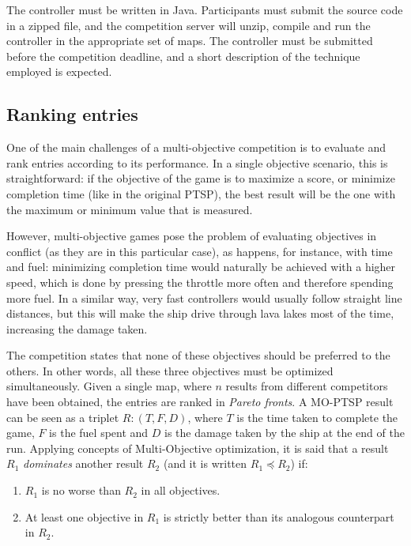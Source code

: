 \documentclass[conference]{IEEEtran}
\begin{document}
The controller must be written in Java. Participants must submit the source code in a zipped file, and the competition server will unzip, compile and run the controller in the appropriate set of maps. The controller must be submitted before the competition deadline, and a short description of the technique employed is expected.


\subsection{Ranking entries}

One of the main challenges of a multi-objective competition is to evaluate and rank entries according to its performance. In a single objective scenario, this is straightforward: if the objective of the game is to maximize a score, or minimize completion time (like in the original PTSP), the best result will be the one with the maximum or minimum value that is measured.

However, multi-objective games pose the problem of evaluating objectives in conflict (as they are in this particular case), as happens, for instance, with time and fuel: minimizing completion time would naturally be achieved with a higher speed, which is done by pressing the throttle more often and therefore spending more fuel. In a similar way, very fast controllers  would usually follow straight line distances, but this will make the ship drive through lava lakes most of the time, increasing the damage taken.

The competition states that none of these objectives should be preferred to the others. In other words, all these three objectives must be optimized simultaneously. Given a single map, where $n$ results from different competitors have been obtained, the entries are ranked in \textit{Pareto fronts}. A MO-PTSP result can be seen as a triplet $R: (T, F, D)$, where $T$ is the time taken to complete the game, $F$ is the fuel spent and $D$ is the damage taken by the ship at the end of the run. Applying concepts of Multi-Objective optimization, it is said that a result $R_1$ \textit{dominates} another result $R_2$ (and it is written $R_1 \preceq R_2$) if:

\begin{enumerate}
\item $R_1$ is no worse than $R_2$ in all objectives.
\item At least one objective in $R_1$ is strictly better than its analogous counterpart in $R_2$.
\end{enumerate}
\end{document}

